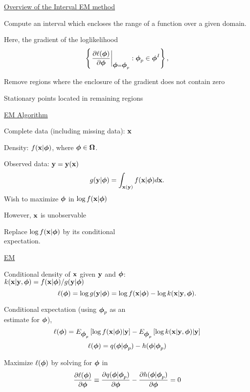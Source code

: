 \documentclass{slides}
\begin{document}
\begin{slide}
\begin{center}
\underline{Overview of the Interval EM method}
\end{center}
Compute an interval which encloses the range
of a function over a given domain.  

Here, the gradient of the loglikelihood
$$
\left\{ \left. \frac{\partial\ell(\mbox{\boldmath $\phi$})}{\partial\mbox{\boldmath $\phi$}}
  \right|_{\mbox{\boldmath $\phi$} = \mbox{\boldmath $\phi$}_p} : \mbox{\boldmath $\phi$}_p \in \mbox{\boldmath $\phi$}^I \right\},
$$

Remove regions where the enclosure of the gradient does not contain zero

Stationary points located in remaining regions

\end{slide}
\begin{slide}
\begin{center}
\underline{EM Algorithm}
\end{center}
Complete data (including missing data): ${\bf x}$ 

Density: $f({\bf x}|\mbox{\boldmath $\phi$})$, where $\mbox{\boldmath $\phi$} \in \mbox{\boldmath $\Omega$}$.  

Observed data: ${\bf y} = {\bf y}({\bf x})$
$$
g({\bf y}|\mbox{\boldmath $\phi$}) = \int_{{\bf x}({\bf y})} f({\bf x}|\mbox{\boldmath $\phi$})d{\bf x}.
$$
Wish to maximize $\mbox{\boldmath $\phi$}$ in $\log f({\bf x}|\mbox{\boldmath $\phi$})$

However, ${\bf x}$ is unobservable

Replace $\log f ({\bf x}|\mbox{\boldmath $\phi$})$ by its conditional \\expectation.  
\end{slide}
\begin{slide}
\begin{center}
\underline{EM}
\end{center}
Conditional density of ${\bf x}$ given ${\bf y}$ and $\mbox{\boldmath $\phi$}$:\\
$k({\bf x}|{\bf y},\mbox{\boldmath $\phi$}) = f({\bf x}|\mbox{\boldmath $\phi$}) / g({\bf y}|\mbox{\boldmath $\phi$})$
$$
\ell(\mbox{\boldmath $\phi$}) = \log g({\bf y}|\mbox{\boldmath $\phi$}) = \log f({\bf x}|\mbox{\boldmath $\phi$}) - 
  \log k({\bf x}|{\bf y},\mbox{\boldmath $\phi$}).
$$

Conditional expectation (using $\mbox{\boldmath $\phi$}_p$ as an \\
estimate for $\mbox{\boldmath $\phi$}$), 
$$
\ell(\mbox{\boldmath $\phi$}) = E_{\mbox{\boldmath $\phi$}_p} \left[\log f({\bf x}|\mbox{\boldmath $\phi$}) | {\bf y} \right] - 
  E_{\mbox{\boldmath $\phi$}_p} \left[ \log k({\bf x}|{\bf y},\mbox{\boldmath $\phi$}) | {\bf y} \right]
$$
$$\ell(\mbox{\boldmath $\phi$}) = q(\mbox{\boldmath $\phi$}|\mbox{\boldmath $\phi$}_p) - h(\mbox{\boldmath $\phi$}|\mbox{\boldmath $\phi$}_p)$$

Maximize $\ell(\mbox{\boldmath $\phi$})$ by solving for $\mbox{\boldmath $\phi$}$ in
$$ 
\frac{\partial \ell(\mbox{\boldmath $\phi$})}{\partial \mbox{\boldmath $\phi$}} \equiv
\frac{\partial q(\mbox{\boldmath $\phi$} | \mbox{\boldmath $\phi$}_p)}{\partial \mbox{\boldmath $\phi$}} - 
\frac{\partial h(\mbox{\boldmath $\phi$} | \mbox{\boldmath $\phi$}_p)}{\partial \mbox{\boldmath $\phi$}} = 0
$$
\end{slide}
\end{document}
